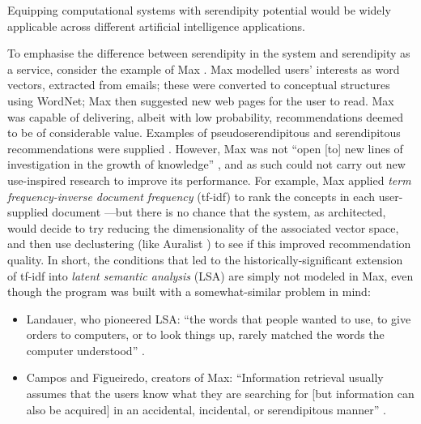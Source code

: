 
Equipping computational systems with serendipity potential would be
widely applicable across different artificial intelligence
applications.

To emphasise the difference between serendipity in the system and
serendipity as a service, consider the example of {\sf Max}
\cite{Figueiredo2001,campos2001searching}.  {\sf Max} modelled users'
interests as word vectors, extracted from emails; these were converted
to conceptual structures using WordNet; {\sf Max} then suggested new
web pages for the user to read.  {\sf Max} was capable of delivering,
albeit with low probability, recommendations deemed to be of
considerable value.  Examples of pseudoserendipitous and serendipitous
recommendations were supplied \cite[p.~59]{Figueiredo2001}.
However, {\sf Max} was not ``open [to] new lines of
investigation in the growth of knowledge''
\cite{swanson1997interactive}, and as such could not carry out
new use-inspired research to improve its performance.  For example,
{\sf Max} applied \emph{term frequency-inverse document frequency}
(tf-idf) to rank the concepts in each user-supplied document
\cite[p.~160]{campos2001searching}---but there is no chance that the
system, as architected, would decide to try reducing the dimensionality
of the associated vector space, and then use declustering (like {\sf
  Auralist} \cite{Zhang2011}) to see if this improved recommendation
quality.  In short, the conditions that led to the historically-significant
extension of tf-idf into \emph{latent
  semantic analysis} (LSA) are simply not modeled in {\sf Max}, even
though the program was built with a somewhat-similar problem in mind:
\begin{itemize}
\item Landauer, who pioneered LSA: ``the words that people wanted to
  use, to give orders to computers, or to look things up, rarely
  matched the words the computer understood'' \cite{landauer2003pasteur}.
\item Campos and Figueiredo, creators of {\sf Max}: ``Information retrieval usually
  assumes that the users know what they are searching for [but information can also be acquired] in an accidental, incidental, or
  serendipitous manner'' \cite{campos2001searching}.
\end{itemize}


